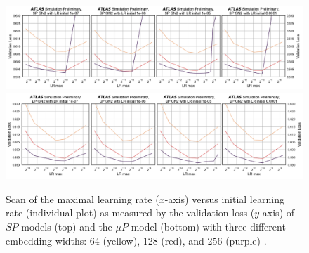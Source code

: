 \begin{figure}[h!]
  \centering
  \includegraphics[width=\textwidth]{Images/FTAG/GN/HPO/fullSP2.png}\\
  \includegraphics[width=\textwidth]{Images/FTAG/GN/HPO/fullmup2.png}
  \caption{Scan of the maximal learning rate ($x$-axis) versus initial learning rate (individual plot) as measured by the validation loss ($y$-axis) of $SP$ models (top) and the $\mu P$ model (bottom) with three different embedding widths: 64 (yellow), 128 (red), and 256 (purple) \cite{publicplotMUP}.}
  \label{fig:fullSPmup}
\end{figure} 

